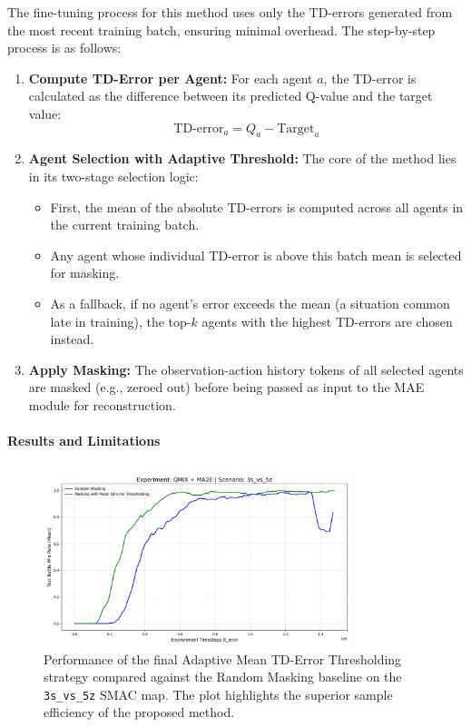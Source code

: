 The fine-tuning process for this method uses only the TD-errors generated from the most recent training batch, ensuring minimal overhead. The step-by-step process is as follows:
\begin{enumerate}
    \item \textbf{Compute TD-Error per Agent:} For each agent $a$, the TD-error is calculated as the difference between its predicted Q-value and the target value:
    \begin{equation}
        \label{eq:td_error_simple}
        \text{TD-error}_a = Q_a - \text{Target}_a
    \end{equation}

    \item \textbf{Agent Selection with Adaptive Threshold:} The core of the method lies in its two-stage selection logic:
    \begin{itemize}
        \item First, the mean of the absolute TD-errors is computed across all agents in the current training batch.
        \item Any agent whose individual TD-error is above this batch mean is selected for masking.
        \item As a fallback, if no agent's error exceeds the mean (a situation common late in training), the top-$k$ agents with the highest TD-errors are chosen instead.
    \end{itemize}

    \item \textbf{Apply Masking:} The observation-action history tokens of all selected agents are masked (e.g., zeroed out) before being passed as input to the MAE module for reconstruction.
\end{enumerate}
\paragraph{Results and Limitations}

\begin{figure}[H]
    \centering
    \includegraphics[width=0.8\textwidth]{images_pfe/results_li-ma2e/test_battle_won_mean_3s_vs_5z_Mean_TD-Error_Thresholding _smoothed.png}
    \caption{Performance of the final Adaptive Mean TD-Error Thresholding strategy compared against the Random Masking baseline on the \texttt{3s\_vs\_5z} SMAC map. The plot highlights the superior sample efficiency of the proposed method.}
    \label{fig:mean_td_vs_random}
\end{figure}


